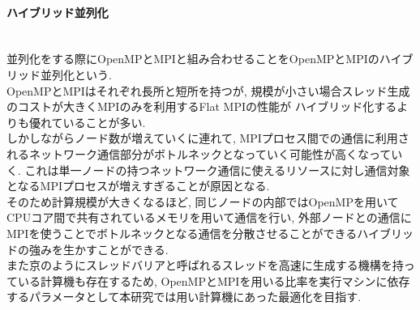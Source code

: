 \paragraph{ハイブリッド並列化}~\\
並列化をする際にOpenMPとMPIと組み合わせることをOpenMPとMPIのハイブリッド並列化という.\\
OpenMPとMPIはそれぞれ長所と短所を持つが, 規模が小さい場合スレッド生成のコストが大きくMPIのみを利用するFlat MPIの性能が
ハイブリッド化するよりも優れていることが多い.\\
しかしながらノード数が増えていくに連れて, MPIプロセス間での通信に利用されるネットワーク通信部分がボトルネックとなっていく可能性が高くなっていく.
これは単一ノードの持つネットワーク通信に使えるリソースに対し通信対象となるMPIプロセスが増えすぎることが原因となる.\\
そのため計算規模が大きくなるほど, 同じノードの内部ではOpenMPを用いてCPUコア間で共有されているメモリを用いて通信を行い,
外部ノードとの通信にMPIを使うことでボトルネックとなる通信を分散させることができるハイブリッドの強みを生かすことができる.\\
また京のようにスレッドバリアと呼ばれるスレッドを高速に生成する機構を持っている計算機も存在するため,
OpenMPとMPIを用いる比率を実行マシンに依存するパラメータとして本研究では用い計算機にあった最適化を目指す.\\
